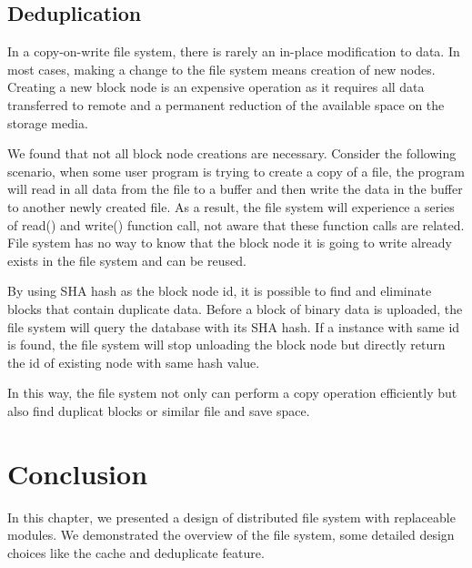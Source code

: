 \subsection{Deduplication}

    In a copy-on-write file system, there is rarely an in-place modification to data. In most cases, making a change to the file system means creation of new nodes. Creating a new block node is an expensive operation as it requires all data transferred to remote and a permanent reduction of the available space on the storage media.
    
    We found that not all block node creations are necessary. Consider the following scenario, when some user program is trying to create a copy of a file, the program will read in all data from the file to a buffer and then write the data in the buffer to another newly created file. As a result, the file system will experience a series of read() and write() function call, not aware that these function calls are related. File system has no way to know that the block node it is going to write already exists in the file system and can be reused.

    By using SHA hash as the block node id, it is possible to find and eliminate blocks that contain duplicate data. Before a block of binary data is uploaded, the file system will query the database with its SHA hash. If a instance with same id is found, the file system will stop unloading the block node but directly return the id of existing node with same hash value.

    In this way, the file system not only can perform a copy operation efficiently but also find duplicat blocks or similar file and save space. 

\section{Conclusion}

    In this chapter, we presented a design of distributed file system with replaceable modules. We demonstrated the overview of the file system, some detailed design choices like the cache and deduplicate feature.
